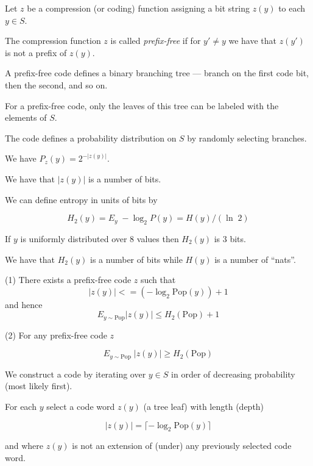 {\vfill
Let $z$ be a compression (or coding) function  assigning a bit string $z(y)$ to each $y \in S$.

\vfill
The compression function $z$ is called {\em prefix-free} if for $y' \not = y$ we have that $z(y')$ is not a prefix of $z(y)$.


A prefix-free code defines a binary branching tree --- branch on the first code bit, then the second, and so on.

\vfill
For a prefix-free code, only the leaves of this tree can be labeled with the elements of $S$.

\vfill
The code defines a probability distribution on $S$ by randomly selecting branches.

\vfill
We have $P_z(y) = 2^{-|z(y)|}$.


We have that $|z(y)|$ is a number of bits.

\vfill
We can define entropy in units of bits by

\vfill
$$H_2(y) = E_y\; - \log_2 P(y) = H(y)/(\ln \;2)$$

\vfill
If $y$ is uniformly distributed over 8 values then $H_2(y)$ is 3 bits.

\vfill
We have that $H_2(y)$ is a number of bits while $H(y)$ is a number of ``nats''.


(1) There exists a prefix-free code $z$ such that
$$|z(y)| <= (- \log_2 \mathrm{Pop}(y)) + 1$$
and hence
$$E_{y\sim \mathrm{Pop}} |z(y)| \leq H_2(\mathrm{Pop}) +1$$

\vfill
(2) For any prefix-free code $z$

$$E_{y \sim \mathrm{Pop}}\;|z(y)| \geq H_2(\mathrm{Pop})$$


\vfill
We construct a code by iterating over $y \in S$ in order of decreasing probability (most likely first).

\vfill
For each $y$ select a code word $z(y)$ (a tree leaf) with length (depth)

\vfill
$$|z(y)| = \lceil - \log_2 \mathrm{Pop}(y)\rceil$$

\vfill
and where $z(y)$ is not an extension of (under) any previously selected code word.


}
